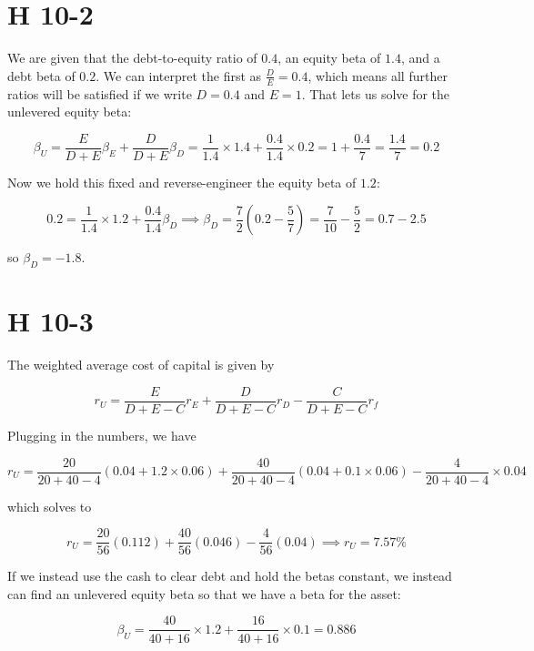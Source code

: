 \documentclass[12pt, letterpaper, parskip = full]{article}
\begin{document}



    \section{H 10-2}

    We are given that the debt-to-equity ratio of \(0.4\), an equity beta of \(1.4\), and a debt beta of \(0.2\). We can interpret the first as \(\frac{D}{E} = 0.4\), which means all further ratios will be satisfied if we write \(D = 0.4\) and \(E = 1\). That lets us solve for the unlevered equity beta:

    \[ \beta_U = \frac{E}{D+E} \beta_E + \frac{D}{D+E} \beta_D = \frac{1}{1.4} \times 1.4 + \frac{0.4}{1.4} \times 0.2 = 1 + \frac{0.4}{7} = \frac{1.4}{7} = 0.2   \]

    Now we hold this fixed and reverse-engineer the equity beta of \(1.2\):
    
    \[ 0.2 = \frac{1}{1.4} \times 1.2 + \frac{0.4}{1.4} \beta_D \implies \beta_D = \frac{7}{2} \left( 0.2 - \frac{5}{7} \right) = \frac{7}{10} - \frac{5}{2} = 0.7 - 2.5 \] 

    so \(\boxed{\beta_D = -1.8}\).



    \section{H 10-3}

    The weighted average cost of capital is given by

    \[
    r_U = \frac{E}{D+E-C} r_E + \frac{D}{D+E-C} r_D - \frac{C}{D+E-C} r_f \]
    
    Plugging in the numbers, we have
    
    \[  r_U = \frac{20}{20 + 40 - 4} \left( 0.04 + 1.2 \times 0.06 \right) + \frac{40}{20 + 40 - 4} \left( 0.04 + 0.1 \times 0.06 \right) - \frac{4}{20 + 40 - 4} \times 0.04 \]

    which solves to 

    \[ r_U = \frac{20}{56} (0.112) + \frac{40}{56} (0.046) - \frac{4}{56} (0.04) \implies \boxed{r_U = 7.57\%}    \]
    

    If we instead use the cash to clear debt and hold the betas constant, we instead can find an unlevered equity beta so that we have a beta for the asset:

    \[ \boxed{\beta_U = \frac{40}{40 + 16} \times 1.2 + \frac{16}{40 + 16} \times 0.1  = 0.886}   \]
\end{document}
